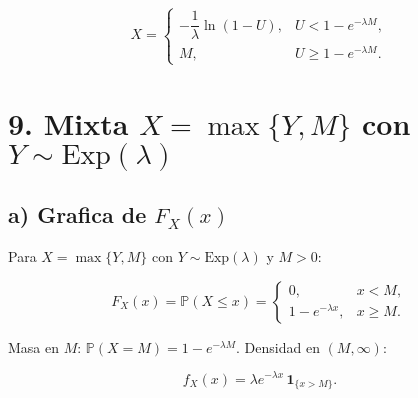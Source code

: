 \documentclass[10pt,a4paper]{article}
\let\le\leqslant
\let\ge\geqslant
\let\leq\leqslant
\let\geq\geqslant
\let\le\leq
\let\ge\geq
\let\oldsection\section
\renewcommand{\section}{%
      \clearpage
      \thispagestyle{myfancy}%
      \oldsection
    }
\begin{document}
\[
X=\begin{cases}
-\dfrac{1}{\lambda}\ln(1-U),&U<1-e^{-\lambda M},\\[6pt]
M,&U\ge 1-e^{-\lambda M}.
\end{cases}
\]

    \hypertarget{mixta-xmaxym-con-ysimmathrmexplambda}{%
\section{\texorpdfstring{9. Mixta \(X=\max\{Y,M\}\) con
\(Y\sim\mathrm{Exp}(\lambda)\)}{9. Mixta X=\textbackslash max\textbackslash\{Y,M\textbackslash\} con Y\textbackslash sim\textbackslash mathrm\{Exp\}(\textbackslash lambda)}}\label{mixta-xmaxym-con-ysimmathrmexplambda}}

    \hypertarget{a-grafica-de-f_xx}{%
\subsection{\texorpdfstring{a) Grafica de
\(F_X(x)\)}{a) Grafica de F\_X(x)}}\label{a-grafica-de-f_xx}}

    Para \(X=\max\{Y,M\}\) con \(Y\sim\mathrm{Exp}(\lambda)\) y \(M>0\):

\[
F_X(x)=\mathbb P(X\le x)=
\begin{cases}
0,& x<M,\\[4pt]
1-e^{-\lambda x},& x\ge M.
\end{cases}
\]

Masa en \(M\): \(\mathbb P(X=M)=1-e^{-\lambda M}\). Densidad en
\((M,\infty)\):

\[
f_X(x)=\lambda e^{-\lambda x}\,\mathbf 1_{\{x>M\}}.
\]
\end{document}
